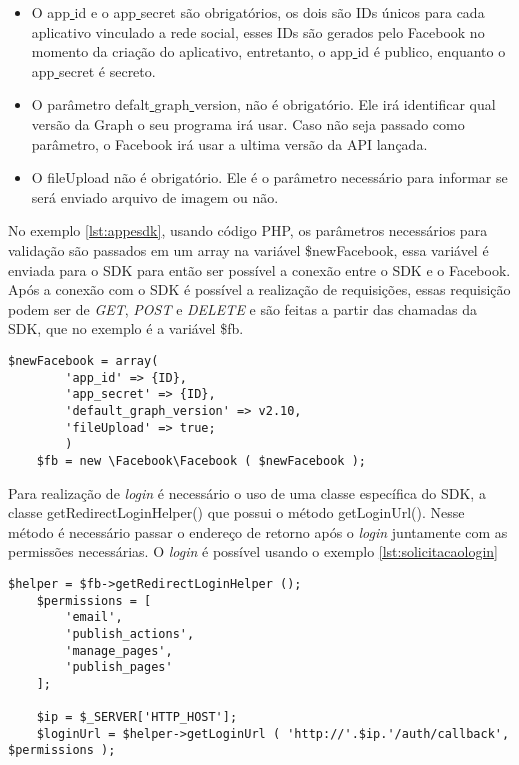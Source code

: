 \begin{itemize}
\item O app\underline{{ }}id e o app\underline{{ }}secret são obrigatórios, os dois são IDs únicos para cada aplicativo vinculado a rede social, esses IDs são gerados pelo Facebook no momento da criação do aplicativo, entretanto, o app\underline{{ }}id é publico, enquanto o app\underline{{ }}secret é secreto.

\item O parâmetro defalt\underline{{ }}graph\underline{{ }}version, não é obrigatório. Ele irá identificar qual versão da Graph o seu programa irá usar. Caso não seja passado como parâmetro, o Facebook irá usar a ultima versão da API lançada.

\item O fileUpload não é obrigatório. Ele é o parâmetro necessário para informar se será enviado arquivo de imagem ou não.
\end{itemize}

No exemplo \ref{lst:appesdk}, usando código PHP, os parâmetros necessários para validação são passados em um array na variável \$newFacebook, essa variável é enviada para o SDK para então ser possível a conexão entre o SDK e o Facebook. Após a conexão com o SDK é possível a realização de requisições, essas requisição podem ser de \textit{GET}, \textit{POST} e \textit{DELETE} e são feitas a partir das chamadas da SDK, que no exemplo é a variável \$fb.

\begin{lstlisting}[caption={Conexão entre aplicativo e SDK},label={lst:appesdk}]
	$newFacebook = array(
		'app_id' => {ID},
		'app_secret' => {ID},
		'default_graph_version' => v2.10,
		'fileUpload' => true;
		)
	$fb = new \Facebook\Facebook ( $newFacebook );
\end{lstlisting}

Para realização de \textit{login} é necessário o uso de uma classe específica do SDK, a classe getRedirectLoginHelper() que possui o método getLoginUrl(). Nesse método é necessário passar o endereço de retorno após o \textit{login} juntamente com as permissões necessárias. O \textit{login} é possível usando o exemplo \ref{lst:solicitacaologin}

\begin{lstlisting}[caption={Solicitação de Login},label={lst:solicitacaologin}]
	$helper = $fb->getRedirectLoginHelper ();
	$permissions = [
		'email',
		'publish_actions',
		'manage_pages',
		'publish_pages'
	];

	$ip = $_SERVER['HTTP_HOST'];
	$loginUrl = $helper->getLoginUrl ( 'http://'.$ip.'/auth/callback', $permissions );
\end{lstlisting}

